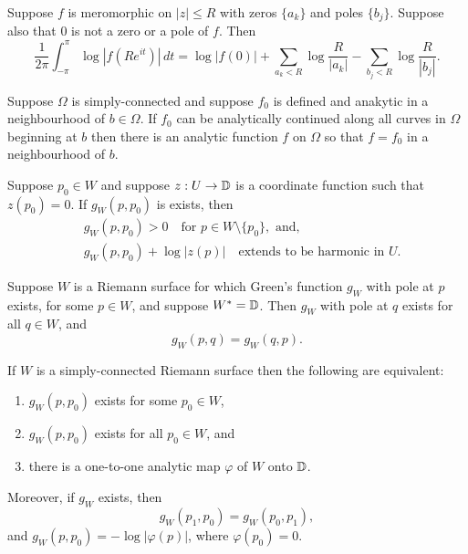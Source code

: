 \documentclass[12pt]{article}
\begin{document}
\begin{theorem}
    Suppose $f$ is meromorphic on $|z|\leq R$ with zeros $\{a_k\}$ and poles $\{b_j\}$. Suppose also that $0$ is not a zero or a pole of $f$. Then
    \begin{equation*}
        \frac{1}{2\pi}\int_{-\pi}^\pi \log|f(Re^{it})|\,dt=\log|f(0)|+\sum_{a_k<R}\log\frac{R}{|a_k|}-\sum_{b_j<R}\log\frac{R}{|b_j|}.
    \end{equation*}
\end{theorem}

\begin{theorem}[Monodromy]
    Suppose $\Omega$ is simply-connected and suppose $f_0$ is defined and anakytic in a neighbourhood of $b\in\Omega$. If $f_0$ can be analytically continued along all curves in $\Omega$ beginning at $b$ then there is an analytic function $f$ on $\Omega$ so that $f=f_0$ in a neighbourhood of $b$.
\end{theorem}

\begin{theorem}
    Suppose $p_0\in W$ and suppose $z:U\to\mathbb{D}$ is a coordinate function such that $z(p_0)=0$. If $g_W(p,p_0)$ is exists, then 
    \begin{align*}
        &g_W(p,p_0)>0\quad \text{for } p\in W\setminus\{p_0\},\text{ and,}\\
        &g_W(p,p_0)+\log |z(p)|\quad\text{extends to be harmonic in } U.
    \end{align*}
\end{theorem}

\begin{theorem}[Green is symmetric if $W=\D$]
    Suppose $W$ is a Riemann surface for which Green's function $g_W$ with pole at $p$ exists, for some $p\in W$, and suppose $W^*=\mathbb{D}$. Then $g_W$ with pole at $q$ exists for all $q\in W$, and
    \begin{equation*}
        g_W(p,q)=g_W(q,p).
    \end{equation*}
\end{theorem}

\begin{theorem}
    If $W$ is a simply-connected Riemann surface then the following are equivalent:
    \begin{enumerate}[label=(\roman*)]
        \item $g_W(p,p_0)$ exists for some $p_0\in W$,
        \item $g_W(p,p_0)$ exists for all $p_0\in W$, and
        \item there is a one-to-one analytic map $\varphi$ of $W$ onto $\mathbb{D}$.
    \end{enumerate}
    Moreover, if $g_W$ exists, then
    \begin{equation*}
        g_W(p_1,p_0)=g_W(p_0,p_1),
    \end{equation*}
    and $g_W(p,p_0)=-\log|\varphi(p)|$, where $\varphi(p_0)=0$.
\end{theorem}
\end{document}
